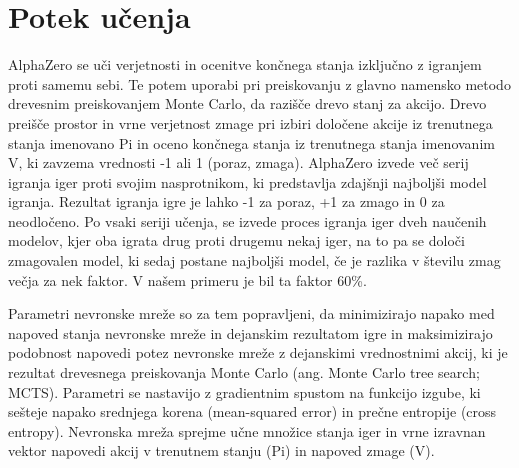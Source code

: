 \documentclass[a4paper, 12pt]{book}
\begin{document}
\section{Potek učenja}
\label{potekUcenja}
AlphaZero se uči verjetnosti in ocenitve končnega stanja izključno z igranjem proti samemu sebi. 
Te potem uporabi pri preiskovanju z glavno namensko metodo drevesnim preiskovanjem Monte Carlo, da razišče drevo stanj za akcijo.
Drevo preišče prostor in vrne verjetnost zmage pri izbiri določene akcije iz trenutnega stanja imenovano Pi in oceno končnega stanja iz trenutnega stanja imenovanim V, ki zavzema vrednosti -1 ali 1 (poraz, zmaga).
AlphaZero izvede več serij igranja iger proti svojim nasprotnikom, ki predstavlja zdajšnji najboljši model igranja.
Rezultat igranja igre je lahko -1 za poraz, +1 za zmago in 0 za neodločeno.
Po vsaki seriji učenja, se izvede proces igranja iger dveh naučenih modelov, kjer oba igrata drug proti drugemu nekaj iger, na to pa se določi zmagovalen model, ki sedaj postane najboljši model, če je razlika v številu zmag večja za nek faktor. V našem primeru je bil ta faktor 60\%.


Parametri nevronske mreže so za tem popravljeni, da minimizirajo napako med napoved stanja nevronske mreže in dejanskim rezultatom igre in maksimizirajo podobnost napovedi potez nevronske mreže z dejanskimi vrednostnimi akcij, ki je rezultat drevesnega preiskovanja Monte Carlo (ang. Monte Carlo tree search; MCTS). 
Parametri se nastavijo z gradientnim spustom na funkcijo izgube, ki sešteje napako srednjega korena (mean-squared error) in prečne entropije (cross entropy).
Nevronska mreža sprejme učne množice stanja iger in vrne izravnan vektor napovedi akcij v trenutnem stanju (Pi) in napoved zmage (V).
\end{document}
